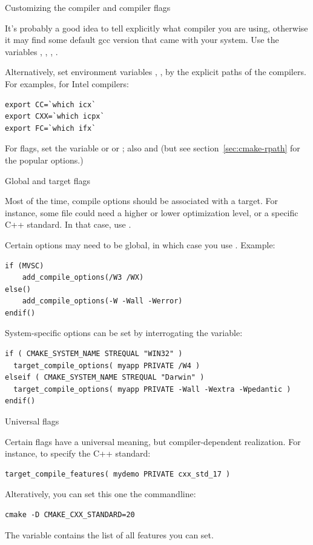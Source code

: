  {Customizing the compiler and compiler flags}

It's probably a good idea to tell  explicitly what compiler you are using,
otherwise it may find some default gcc version that came with your system.
Use the variables , ,
,
.

Alternatively, set environment variables
, , 
by the explicit paths of the compilers.
For examples, for Intel compilers:
\begin{lstlisting}
export CC=`which icx`
export CXX=`which icpx`
export FC=`which ifx`
\end{lstlisting}

For flags, set the variable
or
or ;
also
 and 
(but see section~\ref{sec:cmake-rpath}
for the popular  options.)

 {Global and target flags}

Most of the time, compile options should be associated with a target.
For instance, some file could need a higher or lower optimization level,
or a specific C++ standard.
In that case, use .

Certain options may need to be global, in which case you use
. Example:
\begin{lstlisting}
if (MVSC)
    add_compile_options(/W3 /WX)
else()
    add_compile_options(-W -Wall -Werror)
endif()
\end{lstlisting}

System-specific options can be set
by interrogating the  variable:
\begin{lstlisting}
if ( CMAKE_SYSTEM_NAME STREQUAL "WIN32" )
  target_compile_options( myapp PRIVATE /W4 )
elseif ( CMAKE_SYSTEM_NAME STREQUAL "Darwin" )
  target_compile_options( myapp PRIVATE -Wall -Wextra -Wpedantic )
endif()
\end{lstlisting}

 {Universal flags}

Certain flags have a universal meaning, but compiler-dependent realization.
For instance, to specify the C++ standard:
\begin{lstlisting}
target_compile_features( mydemo PRIVATE cxx_std_17 )
\end{lstlisting}
Alteratively, you can set this one the commandline:
\begingroup\lstset{language=shell}
\begin{lstlisting}
cmake -D CMAKE_CXX_STANDARD=20
\end{lstlisting}
\endgroup
The variable 
contains the list of all features you can set.

